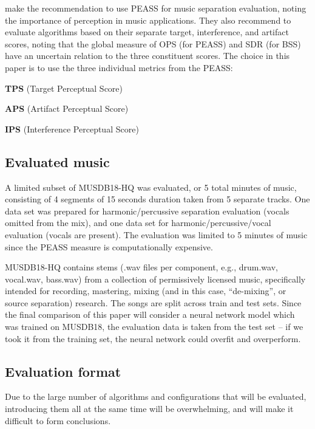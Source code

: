 \documentclass[10pt,letter]{article}
\newenvironment{tight_enumerate}{
\begin{enumerate}
\setlength{\itemsep}{0pt}
\setlength{\parskip}{0pt}
}{\end{enumerate}}
\begin{document}
\citet{beassvpeass} make the recommendation to use PEASS for music separation evaluation, noting the importance of perception in music applications. They also recommend to evaluate algorithms based on their separate target, interference, and artifact scores, noting that the global measure of OPS (for PEASS) and SDR (for BSS) have an uncertain relation to the three constituent scores. The choice in this paper is to use the three individual metrics from the PEASS:
\begin{tight_enumerate}
	\vspace{-0.5em}
	\item
		\textbf{TPS} (Target Perceptual Score)
	\item
		\textbf{APS} (Artifact Perceptual Score)
	\item
		\textbf{IPS} (Interference Perceptual Score)
\end{tight_enumerate}

\subsection{Evaluated music}

A limited subset of MUSDB18-HQ was evaluated, or 5 total minutes of music, consisting of 4 segments of 15 seconds duration taken from 5 separate tracks. One data set was prepared for harmonic/percussive separation evaluation (vocals omitted from the mix), and one data set for harmonic/percussive/vocal evaluation (vocals are present). The evaluation was limited to 5 minutes of music since the PEASS measure is computationally expensive.

MUSDB18-HQ contains stems (.wav files per component, e.g., drum.wav, vocal.wav, bass.wav) from a collection of permissively licensed music, specifically intended for recording, mastering, mixing (and in this case, ``de-mixing'', or source separation) research. The songs are split across train and test sets. Since the final comparison of this paper will consider a neural network model which was trained on MUSDB18, the evaluation data is taken from the test set -- if we took it from the training set, the neural network could overfit and overperform.

\subsection{Evaluation format}

Due to the large number of algorithms and configurations that will be evaluated, introducing them all at the same time will be overwhelming, and will make it difficult to form conclusions.
\end{document}
